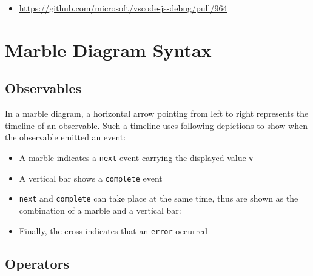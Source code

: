 \begin{itemize}
  \item \url{https://github.com/microsoft/vscode-js-debug/pull/964}
\end{itemize}





\section{Marble Diagram Syntax}
\label{sec:marble-diagram-syntax}


\subsection*{Observables}

In a marble diagram, a horizontal arrow  pointing from left to right represents the timeline of an observable. Such a timeline uses following depictions to show when the observable emitted an event:

\begin{itemize}
  \item A marble  indicates a \texttt{next} event carrying the displayed value \texttt{v}
  \item A vertical bar  shows a \texttt{complete} event
  \item \texttt{next} and \texttt{complete} can take place at the same time, thus are shown as the combination of a marble and a vertical bar: 
  \item Finally, the cross  indicates that an \texttt{error} occurred
\end{itemize}

\subsection*{Operators}

